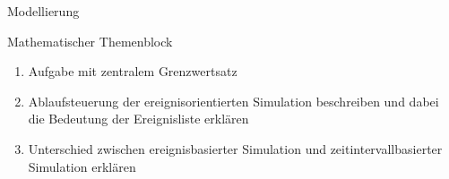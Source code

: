 \documentclass{article}
\begin{document}
\begin{exercise}{Modellierung}
  \begin{solution}
  \end{solution}
\end{exercise}

\begin{exercise}{Mathematischer Themenblock}
  \begin{enumerate}
    \item Aufgabe mit zentralem Grenzwertsatz
    \item Ablaufsteuerung der ereignisorientierten Simulation beschreiben und dabei die Bedeutung der Ereignisliste erklären
    \item Unterschied zwischen ereignisbasierter Simulation und zeitintervallbasierter Simulation erklären
  \end{enumerate}

  \begin{solution}
  \end{solution}
\end{exercise}
\end{document}
